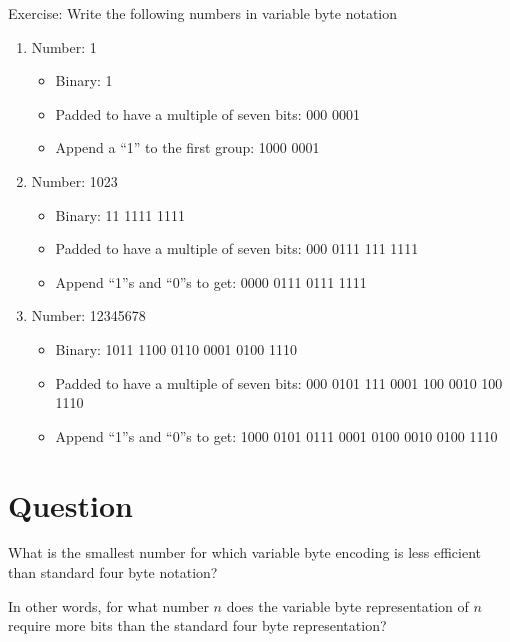 \documentclass[12pt]{article}
\begin{document}
Exercise: Write the following numbers in variable byte notation
\begin{enumerate}[(1)]
  \item Number: 1
	 \begin{itemize}
	   \item Binary: 1
	   \item Padded to have a multiple of seven bits: 000 0001
	   \item Append a ``1'' to the first group: 1000 0001
	 \end{itemize}
  \item Number: 1023
	 \begin{itemize}
	   \item Binary: 11 1111 1111
	   \item Padded to have a multiple of seven bits: 000 0111 111 1111
	   \item Append ``1''s and ``0''s to get: 0000 0111 0111 1111
	 \end{itemize}
  \item Number: 12345678
	 \begin{itemize}
	   \item Binary: 1011 1100 0110 0001 0100 1110
	   \item Padded to have a multiple of seven bits: 000 0101 111 0001 100 0010 100 1110
	   \item Append ``1''s and ``0''s to get: 1000 0101 0111 0001 0100 0010 0100 1110
	 \end{itemize}
\end{enumerate}



\section{Question}

What is the smallest number for which variable byte encoding is 
less efficient than standard four byte notation? 

In other words, for what number $n$ does the variable byte representation 
of $n$ require more bits than the standard four byte representation?
\end{document}
